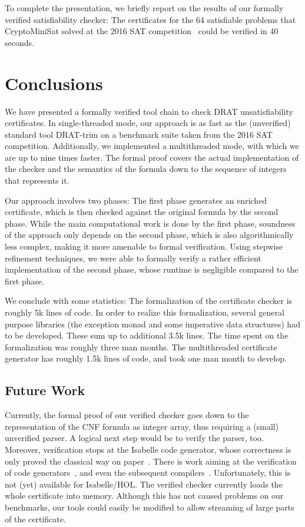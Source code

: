 \documentclass{llncs}
\begin{document}
To complete the presentation, we briefly report on the results of our formally verified satisfiability checker:
The certificates for the 64 satisfiable problems that CryptoMiniSat solved at the 2016 SAT competition~\cite{satcomp-2016} could be verified in 40 seconds.

\section{Conclusions}\label{sec:concl}
We have presented a formally verified tool chain to check DRAT unsatisfiability certificates. 
In single-threaded mode, our approach is as fast as the (unverified) standard tool DRAT-trim on a benchmark 
suite taken from the 2016 SAT competition. Additionally, we implemented a multithreaded mode, with 
which we are up to nine times faster.
The formal proof covers the actual implementation of the checker and the semantics of the 
formula down to the sequence of integers that represents it.

Our approach involves two phases: The first phase generates an enriched certificate, 
which is then checked against the original formula by the second phase.
While the main computational work is done by the first phase, soundness of the approach 
only depends on the second phase, which is also algorithmically less complex, making it more amenable to formal verification. 
Using stepwise refinement techniques, we were able to formally verify a rather efficient implementation of the second phase, 
whose runtime is negligible compared to the first phase.

We conclude with some statistics: The formalization of the certificate checker is roughly 5k lines of code.
In order to realize this formalization, several general purpose libraries (\eg the exception monad and some imperative data structures) had to be developed. 
These sum up to additional 3.5k lines. The time spent on the formalization was roughly three man months. The multithreaded certificate generator has roughly 1.5k 
lines of code, and took one man month to develop.

\subsection{Future Work}
Currently, the formal proof of our verified checker goes down to the representation of the CNF formula as integer array,
thus requiring a (small) unverified parser. A logical next step would be to verify the parser, too.
Moreover, verification stops at the Isabelle code generator, whose correctness is only proved the classical way on paper~\cite{HaNi10,HKKN13}. 
There is work aiming at the verification of code generators~\cite{MO14}, and even the subsequent compilers~\cite{KMNO14}. 
Unfortunately, this is not (yet) available for Isabelle/HOL. 
The verified checker currently loads the whole certificate into memory. Although this has not caused problems on our benchmarks, 
our tools could easily be modified to allow streaming of large parts of the certificate.
\end{document}
